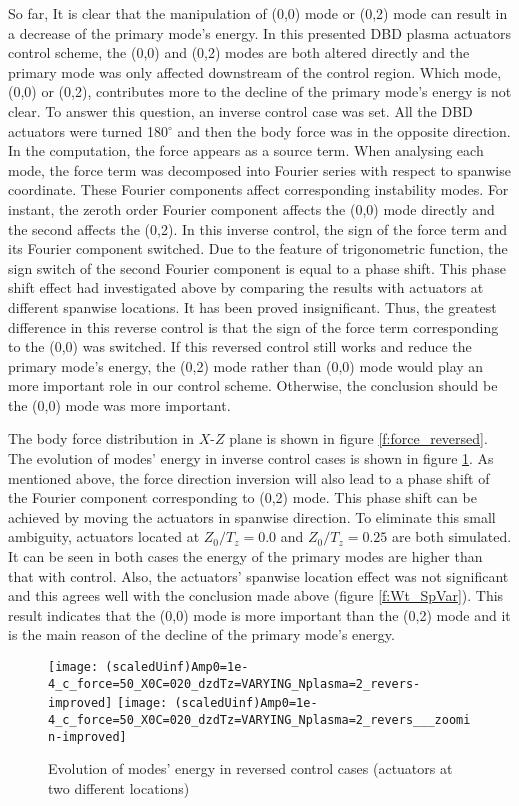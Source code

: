 \documentclass{AIAA}
\begin{document}
So far, It is clear that the manipulation of (0,0) mode \cite{Saric1998} or (0,2) mode can result in a decrease of the primary mode's energy. In this presented DBD plasma actuators control scheme, the (0,0) and (0,2) modes are both altered directly and the primary mode was only affected downstream of the control region. Which mode, (0,0) or (0,2), contributes more to the decline of the primary mode's energy is not clear. To answer this question, an inverse control case was set. All the DBD actuators were turned 180$^\circ$ and then the body force was in the opposite direction. In the computation, the force appears as a source term. When analysing each mode, the force term was decomposed into Fourier series with respect to spanwise coordinate. These Fourier components affect corresponding instability modes. For instant, the zeroth order Fourier component affects the (0,0) mode directly and the second affects the (0,2). In this inverse control, the sign of the force term and its Fourier component switched. Due to the feature of trigonometric function, the sign switch of the second Fourier component is equal to a phase shift. This phase shift effect had investigated above by comparing the results with actuators at different spanwise locations. It has been proved insignificant. Thus, the greatest difference in this reverse control is that the sign of the force term corresponding to the (0,0) was switched. If this reversed control still works and reduce the primary mode's energy, the (0,2) mode rather than (0,0) mode would play an more important role in our control scheme. Otherwise, the conclusion should be the (0,0) mode was more important.

The body force distribution in $X$-$Z$ plane is shown in figure \ref{f:force_reversed}. The evolution of modes' energy in inverse control cases is shown in figure \ref{f:model_energy_revers}. As mentioned above, the force direction inversion will also lead to a phase shift of the Fourier component corresponding to (0,2) mode. This phase shift can be achieved by moving the actuators in spanwise direction. To eliminate this small ambiguity, actuators located at $Z_0/T_z=0.0$ and $Z_0/T_z=0.25$ are both simulated. It can be seen in both cases the energy of the primary modes are higher than that with control. Also, the actuators' spanwise location effect was not significant and this agrees well with the conclusion made above (figure \ref{f:Wt_SpVar}). This result indicates that the (0,0) mode is more important than the (0,2) mode and it is the main reason of the decline of the primary mode's energy.
\begin{figure}
\centering
\texttt{[image: (scaledUinf)Amp0=1e-4\_c\_force=50\_X0C=020\_dzdTz=VARYING\_Nplasma=2\_revers-improved]}
\texttt{[image: (scaledUinf)Amp0=1e-4\_c\_force=50\_X0C=020\_dzdTz=VARYING\_Nplasma=2\_revers\_\_\_zoomin-improved]}
\caption{Evolution of modes' energy in reversed control cases (actuators at two different locations)}%
\label{f:model_energy_revers}
\end{figure}
\end{document}
